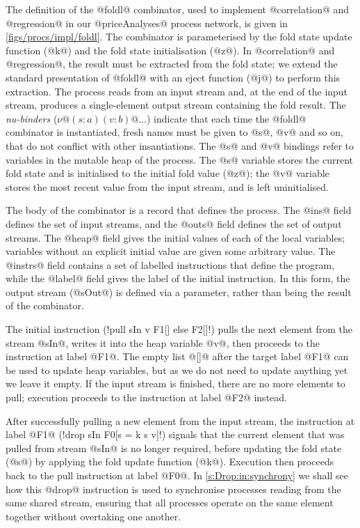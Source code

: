 The definition of the @foldl@ combinator, used to implement @correlation@ and @regression@ in our @priceAnalyses@ process network, is given in \autoref{figs/procs/impl/foldl}.
The combinator is parameterised by the fold state update function (@k@) and the fold state initialisation (@z@).
In @correlation@ and @regression@, the result must be extracted from the fold state; we extend the standard presentation of @foldl@ with an eject function (@j@) to perform this extraction.
The process reads from an input stream and, at the end of the input stream, produces a single-element output stream containing the fold result.
The \emph{nu-binders} ($\nu@ (s : a) (v : b)@\ldots$) indicate that each time the @foldl@ combinator is instantiated, fresh names must be given to @s@, @v@ and so on, that do not conflict with other insantiations.
The @s@ and @v@ bindings refer to variables in the mutable heap of the process.
The @s@ variable stores the current fold state and is initialised to the initial fold value (@z@); the @v@ variable stores the most recent value from the input stream, and is left uninitialised.

The body of the combinator is a record that defines the process.
The @ins@ field defines the set of input streams, and the @outs@ field defines the set of output streams.
The @heap@ field gives the initial values of each of the local variables; variables without an explicit initial value are given some arbitrary value.
The @instrs@ field contains a set of labelled instructions that define the program, while the @label@ field gives the label of the initial instruction.
In this form, the output stream (@sOut@) is defined via a parameter, rather than being the result of the combinator.

The initial instruction (\lstiproc!pull sIn v F1[] else F2[]!) pulls the next element from the stream @sIn@, writes it into the heap variable @v@, then proceeds to the instruction at label @F1@.
The empty list @[]@ after the target label @F1@ can be used to update heap variables, but as we do not need to update anything yet we leave it empty. 
If the input stream is finished, there are no more elements to pull; execution proceeds to the instruction at label @F2@ instead.

After successfully pulling a new element from the input stream, the instruction at label @F1@ (\lstiproc!drop sIn F0[s = k s v]!) signals that the current element that was pulled from stream @sIn@ is no longer required, before updating the fold state (@s@) by applying the fold update function (@k@).
Execution then proceeds back to the pull instruction at label @F0@.
In \autoref{s:Drop:in:synchrony} we shall see how this @drop@ instruction is used to synchronise processes reading from the same shared stream, ensuring that all processes operate on the same element together without overtaking one another.


